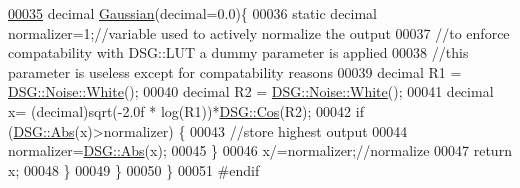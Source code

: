 \begin{DoxyCode}
\hypertarget{_gaussian_8h_source_l00035}{}\hyperlink{namespace_d_s_g_1_1_noise_a87c4bcd92a902d32df1d7f1d5acffcd4}{00035}         decimal \hyperlink{namespace_d_s_g_1_1_noise_a87c4bcd92a902d32df1d7f1d5acffcd4}{Gaussian}(decimal=0.0)\{
00036             \textcolor{keyword}{static} decimal normalizer=1;\textcolor{comment}{//variable used to actively normalize the output}
00037             \textcolor{comment}{//to enforce compatability with DSG::LUT a dummy parameter is applied}
00038             \textcolor{comment}{//this parameter is useless except for compatability reasons}
00039             decimal R1 = \hyperlink{namespace_d_s_g_1_1_noise_a0d1c4b4522d2e56b1aa604e45ab92066}{DSG::Noise::White}();
00040             decimal R2 = \hyperlink{namespace_d_s_g_1_1_noise_a0d1c4b4522d2e56b1aa604e45ab92066}{DSG::Noise::White}();
00041             decimal x= (decimal)sqrt(-2.0f * log(R1))*\hyperlink{namespace_d_s_g_ade303ad15c77f534429305c3cbd90191}{DSG::Cos}(R2);
00042             \textcolor{keywordflow}{if} (\hyperlink{namespace_d_s_g_a0af03bade7e25e8da80e3022af0e45a7}{DSG::Abs}(x)>normalizer) \{
00043                 \textcolor{comment}{//store highest output}
00044                 normalizer=\hyperlink{namespace_d_s_g_a0af03bade7e25e8da80e3022af0e45a7}{DSG::Abs}(x);
00045             \}
00046             x/=normalizer;\textcolor{comment}{//normalize}
00047             \textcolor{keywordflow}{return} x;
00048         \}
00049     \}
00050 \}
00051 \textcolor{preprocessor}{#endif}
\end{DoxyCode}
